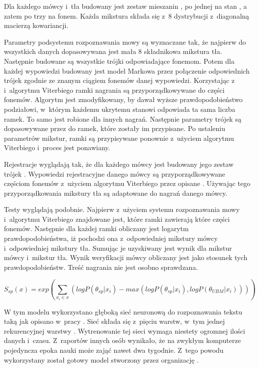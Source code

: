 Dla każdego mówcy i~tła budowany jest zestaw mieszanin , po jednej na stan ,
a zatem po trzy na fonem. Każda mikstura składa się z~$8$ dystrybucji z~diagonalną macierzą kowariancji.

Parametry podsystemu rozpoznawania mowy są wyznaczane tak, że najpierw do wszystkich danych
dopasowywana jest mała 8 składnikowa mikstura tła. Następnie budowane są wszystkie trójki 
odpowiadające fonemom. Potem dla każdej wypowiedzi budowany jest model Markowa przez połączenie odpowiednich
trójek zgodnie ze znanym ciągiem fonemów danej wypowiedzi. Korzystając z~ i~algorytmu Viterbiego
ramki nagrania są przyporządkowywane do części fonemów. Algorytm jest zmodyfikowany, by dawał wyższe prawdopodobieństwo
podziałowi, w~którym każdemu ukrytemu stanowi odpowiada ta sama liczba ramek. To samo jest robione dla innych nagrań.
Następnie parametry trójek  są dopasowywane przez  do ramek, które zostały im przypisane.
Po ustaleniu parametrów mikstur, ramki są przypisywane ponownie z~użyciem algorytmu Viterbiego i~proces jest ponawiany.

Rejestracje wyglądają tak, że dla każdego mówcy jest budowany jego zestaw trójek .
Wypowiedzi rejestracyjne danego mówcy są przyporządkowywane
częściom fonemów z~użyciem algorytmu Viterbiego przez opisane .
Używając tego przyporządkowania mikstury tła są  adaptowane do nagrań danego mówcy.

Testy wyglądają podobnie. Najpierw z~użyciem systemu rozpoznawania mowy i~algorytmu Viterbiego znajdowane
jest, które ramki zawierają które części fonemów. Następnie dla każdej ramki obliczany jest logarytm prawdopodobieństwa,
iż pochodzi ona z~odpowiedniej mikstury mówcy i~odpowiedniej mikstury tła. Sumując je uzyskiwany jest wynik dla mikstur
mówcy i~mikstur tła. Wynik weryfikacji mówcy obliczany jest jako stosunek tych prawdopodobieństw. Treść
nagrania nie jest osobno sprawdzana.

$$S_{sp}(x) = exp(\sum_{x_i \in x} (log P(\theta_{sp} | x_i) - max(log P(\theta_{sp} | x_i), log P(\theta_{UBM} | x_i))))$$

\label{sec:dnn_gmm}

W tym modelu wykorzystano głęboką sieć neuronową do rozpoznawania tekstu taką jak opisano w~pracy \cite{endToEnd}.
Sieć składa się z~pięciu warstw, w~tym jednej rekurencyjnej warstwy .
Wytrenowanie tej sieci wymaga niestety ogromnej ilości danych i~czasu. Z~raportów innych osób wynikało, że na
zwykłym komputerze pojedyncza epoka nauki może zająć nawet dwa tygodnie. Z~tego powodu wykorzystany został
gotowy model stworzony przez organizację .

